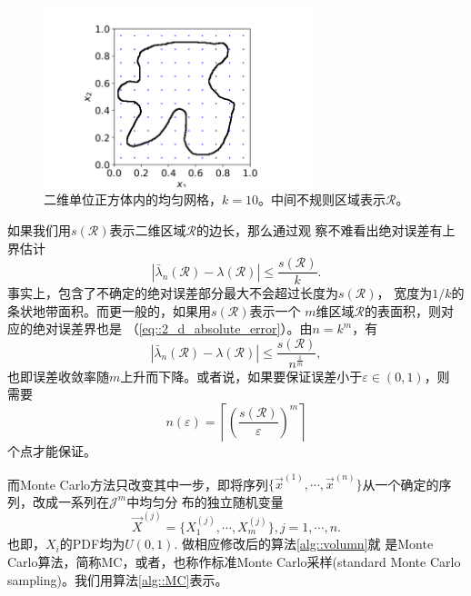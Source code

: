 \begin{figure}[!ht]
\centering
\includegraphics[width=0.7\textwidth]{images/lattice.png}
\caption{二维单位正方体内的均匀网格，$k = 10$。中间不规则区域表示$\mathscr{R}$。}
\label{fig::2_d_lattice}
\end{figure}

如果我们用$s(\mathscr{R})$表示二维区域$\mathscr{R}$的边长，那么通过观
察不难看出绝对误差有上界估计
\begin{equation}
  \left|\bar{\lambda}_n(\mathscr{R}) - \lambda(\mathscr{R})\right|
  \leq \frac{s(\mathscr{R})}{k}.
  \label{eq::2_d_absolute_error}
\end{equation}
事实上，包含了不确定的绝对误差部分最大不会超过长度为$s(\mathscr{R})$，
宽度为$1/k$的条状地带面积。而更一般的，如果用$s(\mathscr{R})$表示一个
$m$维区域$\mathscr{R}$的表面积，则对应的绝对误差界也是
（\ref{eq::2_d_absolute_error}）。由$n = k^m$，有
\begin{equation}
  \left|\bar{\lambda}_n(\mathscr{R}) - \lambda(\mathscr{R})\right|
  \leq \frac{s(\mathscr{R})}{n^{\frac{1}{m}}},
  \label{eq::m_d_absolute_error}
\end{equation}
也即误差收敛率随$m$上升而下降。或者说，如果要保证误差小于$\varepsilon \in (0, 1)$，则
需要
$$
n(\varepsilon) =
\left\lceil\left(\frac{s(\mathscr{R})}{\varepsilon}\right)^m\right\rceil
$$
个点才能保证。

而Monte Carlo方法只改变其中一步，即将序列$\{\vec{x}^{(1)}, \cdots,
\vec{x}^{(n)}\}$从一个确定的序列，改成一系列在$\mathscr{J}^m$中均匀分
布的独立随机变量
$$
\vec{X}^{(j)} = \{X_1^{(j)}, \cdots, X_m^{(j)}\}, j = 1, \cdots, n.
$$也即，$X_i$的PDF均为$U(0, 1)$. 做相应修改后的算法\ref{alg::volumn}就
是Monte Carlo算法，简称MC，或者，也称作标准Monte Carlo采样(standard
Monte Carlo sampling)。我们用算法\ref{alg::MC}表示。

